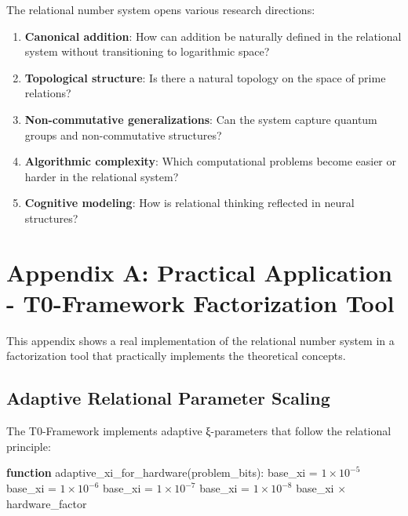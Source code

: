 	The relational number system opens various research directions:
	
	\begin{enumerate}
		\item \textbf{Canonical addition}: How can addition be naturally defined in the relational system without transitioning to logarithmic space?
		\item \textbf{Topological structure}: Is there a natural topology on the space of prime relations?
		\item \textbf{Non-commutative generalizations}: Can the system capture quantum groups and non-commutative structures?
		\item \textbf{Algorithmic complexity}: Which computational problems become easier or harder in the relational system?
		\item \textbf{Cognitive modeling}: How is relational thinking reflected in neural structures?
	\end{enumerate}
	
	\section{Appendix A: Practical Application - T0-Framework Factorization Tool}
	
	This appendix shows a real implementation of the relational number system in a factorization tool that practically implements the theoretical concepts.
	
	\subsection{Adaptive Relational Parameter Scaling}
	
	The T0-Framework implements adaptive ξ-parameters that follow the relational principle:
	
	\begin{algorithm}[H]
\scriptsize
		\caption{Adaptive $\xi$-Parameters in the Relational System}
		\label{alg:adaptive_xi}
		\begin{algorithmic}[1]
			\STATE \textbf{function} adaptive\_xi\_for\_hardware(problem\_bits):
			\STATE base\_xi = $1 \times 10^{-5}$ 
			\STATE base\_xi = $1 \times 10^{-6}$ 
			\STATE base\_xi = $1 \times 10^{-7}$ 
			\ELSE
			\STATE base\_xi = $1 \times 10^{-8}$ 
			\ENDIF
			\RETURN base\_xi $\times$ hardware\_factor
		\end{algorithmic}
	\end{algorithm}
	
